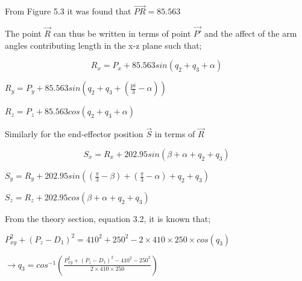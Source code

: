 \documentclass[12pt,openany,a4paper]{book}
\begin{document}
From Figure 5.3 it was found that $\vec{PR} = 85.563$

The point $\vec{R}$ can thus be written in terms of point $\vec{P'}$ and the affect of the arm angles contributing length in the x-z plane such that;



\vspace{\baselineskip}
\begin{equation}
R_x = P_x + 85.563 sin( q_2 + q_3 + \alpha)
\end{equation}
\begin{center}
\vspace{\baselineskip}
$R_y = P_y + 85.563 sin( q_2 + q_3 + (\frac{pi}{3} - \alpha))$

\vspace{\baselineskip}
$R_z = P_z + 85.563 cos( q_2 + q_3 + \alpha)$

\end{center}

\vspace{\baselineskip}

Similarly for the end-effector position $\vec{S}$ in terms of $\vec{R}$


\begin{equation}
S_x = R_x + 202.95 sin( \beta + \alpha + q_2 + q_3)
\end{equation}
\begin{center}
\vspace{\baselineskip}
$S_y = R_y + 202.95 sin ( (\frac{\pi}{3} - \beta) + (\frac{\pi}{3} - \alpha) + q_2 + q_3)$

\vspace{\baselineskip}
$S_z = R_z + 202.95 cos( \beta + \alpha + q_2 + q_3)$ 

\end{center}
\vspace{\baselineskip}

From the theory section, equation 3.2, it is known that;

\vspace{\baselineskip}
\begin{center}
$P_{xy}^2 + (P_z - D_1)^2 = 410^2 + 250^2 - 2 \times 410 \times 250 \times cos(q_3)$

\vspace{\baselineskip}
$\rightarrow q_3 = cos^{-1} ( \frac{P_{xy}^2 + (P_z - D_1)^2 - 410^2 -250^2 }{2 \times 410 \times 250} )$
\end{center}

\vspace{\baselineskip}
\end{document}
